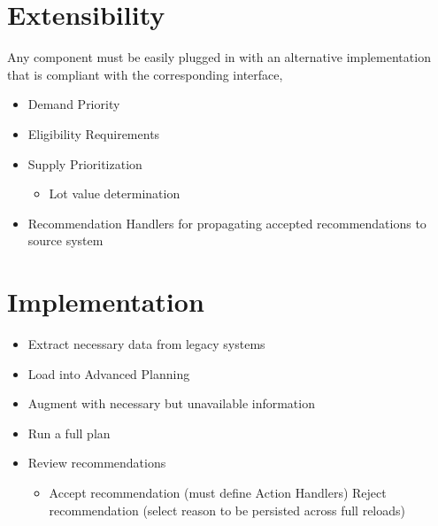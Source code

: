 \documentclass[letterpaper,10pt,english]{sphinxmanual}
\begin{document}
\chapter{Extensibility}
\label{FutureState:extensibility}
Any component must be easily plugged in with an alternative
implementation that is compliant with the corresponding interface,
\begin{itemize}
\item {} 
Demand Priority

\item {} 
Eligibility Requirements

\item {} 
Supply Prioritization
\begin{itemize}
\item {} 
Lot value determination

\end{itemize}

\item {} 
Recommendation Handlers for propagating accepted recommendations to
source system

\end{itemize}


\chapter{Implementation}
\label{FutureState:implementation}\begin{itemize}
\item {} 
Extract necessary data from legacy systems

\item {} 
Load into Advanced Planning

\item {} 
Augment with necessary but unavailable information

\item {} 
Run a full plan

\item {} 
Review recommendations
\begin{itemize}
\item {} 
Accept recommendation (must define Action Handlers) Reject
recommendation (select reason to be persisted across full reloads)

\end{itemize}

\end{itemize}
\end{document}
